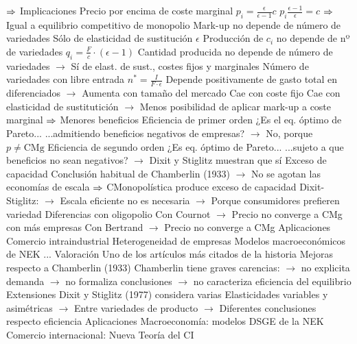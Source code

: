 \documentclass{nuevotema}
\begin{document}
\begin{esquemal}
				\4[] $\Rightarrow$ 
			\3 Implicaciones
				\4 Precio por encima de coste marginal
				\4[] $p_i = \frac{\epsilon}{\epsilon -1} c$
				\4[] $p_i \frac{\epsilon -1}{\epsilon} = c$
				\4[] $\Rightarrow$ Igual a equilibrio competitivo de monopolio
				\4 Mark-up no depende de número de variedades
				\4[] Sólo de elasticidad de sustitución $\epsilon$
				\4 Producción de $c_i$ no depende de nº de variedades
				\4[] $q_i = \frac{F}{c} \cdot \left( \epsilon - 1 \right)$
				\4[] Cantidad producida no depende de número de variedades
				\4[] $\to$ Sí de elast. de sust., costes fijos y marginales
				\4 Número de variedades con libre entrada
				\4[] $n^* = \frac{I}{F\cdot \epsilon}$
				\4[] Depende positivamente de gasto total en diferenciados
				\4[] $\to$ Aumenta con tamaño del mercado
				\4[] Cae con coste fijo
				\4[] Cae con elasticidad de sustitutición
				\4[] $\to$ Menos posibilidad de aplicar mark-up a coste marginal
				\4[] $\Rightarrow$ Menores beneficios
				\4 Eficiencia de primer orden
				\4[] ¿Es el eq. óptimo de Pareto...
				\4[] ...admitiendo beneficios negativos de empresas?
				\4[] $\to$ No, porque $p \neq \text{CMg}$
				\4 Eficiencia de segundo orden
				\4[] ¿Es eq. óptimo de Pareto...
				\4[] ...sujeto a que beneficios no sean negativos?
				\4[] $\to$ Dixit y Stiglitz muestran que sí
				\4 Exceso de capacidad
				\4[] Conclusión habitual de Chamberlin (1933)
				\4[] $\to$ No se agotan las economías de escala
				\4[] $\Rightarrow$ CMonopolística produce exceso de capacidad
				\4[] Dixit-Stiglitz:
				\4[] $\to$ Escala eficiente no es necesaria
				\4[] $\to$ Porque consumidores prefieren variedad
				\4 Diferencias con oligopolio
				\4[] Con Cournot
				\4[] $\to$ Precio no converge a CMg con más empresas
				\4[] Con Bertrand
				\4[] $\to$ Precio no converge a CMg
			\3 Aplicaciones
				\4 Comercio intraindustrial
				\4 Heterogeneidad de empresas
				\4 Modelos macroeconómicos de NEK
				\4 ...
			\3 Valoración
				\4 Uno de los artículos más citados de la historia
				\4 Mejoras respecto a Chamberlin (1933)
				\4[] Chamberlin tiene graves carencias:
				\4[] $\to$ no explicita demanda
				\4[] $\to$ no formaliza conclusiones
				\4[] $\to$ no caracteriza eficiencia del equilibrio
				\4 Extensiones
				\4[] Dixit y Stiglitz (1977) considera varias
				\4[] Elasticidades variables y asimétricas
				\4[] $\to$ Entre variedades de producto
				\4[] $\to$ Diferentes conclusiones respecto eficiencia
				\4 Aplicaciones
				\4[] Macroeconomía: modelos DSGE de la NEK
				\4[] Comercio internacional: Nueva Teoría del CI

\end{esquemal}
\end{document}
